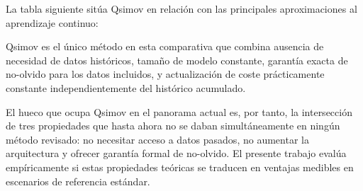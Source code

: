 La tabla siguiente sitúa Qsimov en relación con las principales aproximaciones al aprendizaje
continuo:

\begin{table}[htbp]
  \centering
  \caption{Comparativa de métodos de aprendizaje continuo.}
  \label{tab:comparativa}
\end{table}

Qsimov es el único método en esta comparativa que combina ausencia de necesidad de datos históricos,
tamaño de modelo constante, garantía exacta de no-olvido para los datos incluidos, y actualización
de coste prácticamente constante independientemente del histórico acumulado.

El hueco que ocupa Qsimov en el panorama actual es, por tanto, la intersección de tres propiedades
que hasta ahora no se daban simultáneamente en ningún método revisado: no necesitar acceso a datos
pasados, no aumentar la arquitectura y ofrecer garantía formal de no-olvido. El presente trabajo
evalúa empíricamente si estas propiedades teóricas se traducen en ventajas medibles en escenarios de
referencia estándar.
